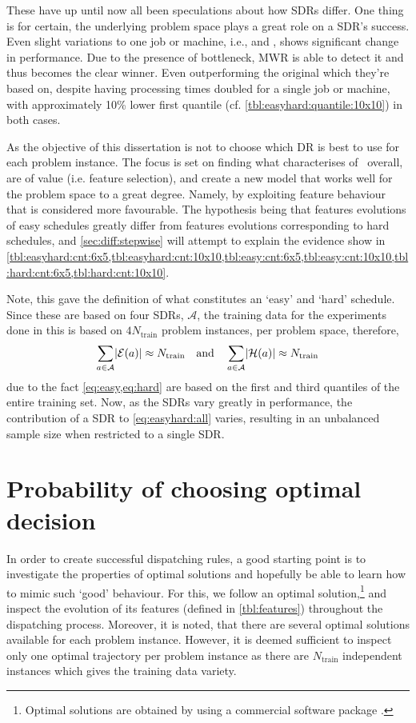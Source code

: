 These have up until now all been speculations about how SDRs differ. One thing is for certain, the underlying problem space plays a great role on a SDR's success. Even slight variations to one job or machine, i.e.,  and , shows significant change in performance. Due to the presence of bottleneck, MWR is able to detect it and thus becomes the clear winner. Even outperforming the original  which they're based on, despite having processing times doubled for a single job or machine, with approximately 10\% lower first quantile (cf. \cref{tbl:easyhard:quantile:10x10}) in both cases. 

As the objective of this dissertation is not to choose which DR is best to use for each problem instance. 
The focus is set on finding what characterises of \jsp\ overall, are of value (i.e. feature selection), and create a new model that works well for the problem space to a great degree.
Namely, by exploiting feature behaviour that is considered more favourable. The hypothesis being that features evolutions of easy schedules greatly differ from features evolutions corresponding to hard schedules, and \cref{sec:diff:stepwise} will attempt to explain the evidence show in \cref{tbl:easyhard:cnt:6x5,tbl:easyhard:cnt:10x10,tbl:easy:cnt:6x5,tbl:easy:cnt:10x10,tbl:hard:cnt:6x5,tbl:hard:cnt:10x10}.

Note, this  gave the definition of what constitutes an `easy' and `hard' schedule. Since these are based on four SDRs, $\mathcal{A}$, the training data for the experiments done in this  is based on $4N_{\text{train}}$ problem instances, per problem space, therefore,
\begin{equation}\label{eq:easyhard:all}
	\sum_{a\in\mathcal{A}}\abs{\mathcal{E}(a)} \approx N_{\text{train}}
	\quad\text{and}\quad
	\sum_{a\in\mathcal{A}}\abs{\mathcal{H}(a)} \approx N_{\text{train}}
\end{equation} 
due to the fact \cref{eq:easy,eq:hard} are based on the first and third quantiles of the entire training set.
Now, as the SDRs vary greatly in performance, the contribution of a SDR to \cref{eq:easyhard:all} varies, resulting in an unbalanced sample size when restricted to a single SDR. 

\section{Probability of choosing optimal decision}\label{sec:diff:opt:rnd}
In order to create successful dispatching rules, a good starting point is to investigate the properties of optimal solutions and hopefully be able to learn how to mimic such `good' behaviour. 
For this, we follow an optimal solution,\footnote{Optimal solutions are obtained by using a commercial software package \cite{gurobi}.} and inspect the evolution of its features  (defined in \cref{tbl:features}) throughout the dispatching process. 
Moreover, it is noted, that there are several optimal solutions available for each problem instance. However, it is deemed sufficient to inspect only one optimal trajectory per problem instance as there are $N_{\text{train}}$ independent instances which gives the training data variety. 


